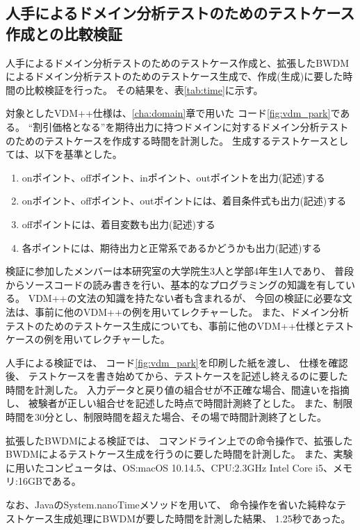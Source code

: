 \documentclass[uplatex, report, a4j, 10pt]{jsbook}
\begin{document}
\subsection{人手によるドメイン分析テストのためのテストケース作成との比較検証}\label{sec:domain_exam}

人手によるドメイン分析テストのためのテストケース作成と、拡張したBWDMによるドメイン分析テストのためのテストケース生成で、作成(生成)に要した時間の比較検証を行った。
その結果を、表\ref{tab:time}に示す。

対象としたVDM++仕様は、\ref{cha:domain}章で用いた コード\ref{fig:vdm_park}である。
“割引価格となる”を期待出力に持つドメインに対するドメイン分析テストのためのテストケースを作成する時間を計測した。
生成するテストケースとしては、以下を基準とした。
\begin{enumerate}
  \item onポイント、offポイント、inポイント、outポイントを出力(記述)する
  \item onポイント、offポイント、outポイントには、着目条件式も出力(記述)する
  \item offポイントには、着目変数も出力(記述)する
  \item 各ポイントには、期待出力と正常系であるかどうかも出力(記述)する
\end{enumerate}

検証に参加したメンバーは本研究室の大学院生3人と学部4年生1人であり、
普段からソースコードの読み書きを行い、基本的なプログラミングの知識を有している。
VDM++の文法の知識を持たない者も含まれるが、
今回の検証に必要な文法は、事前に他のVDM++の例を用いてレクチャーした。
また、ドメイン分析テストのためのテストケース生成についても、事前に他のVDM++仕様とテストケースの例を用いてレクチャーした。

人手による検証では、
コード\ref{fig:vdm_park}を印刷した紙を渡し、
仕様を確認後、
テストケースを書き始めてから、テストケースを記述し終えるのに要した時間を計測した。
入力データと戻り値の組合せが不正確な場合、間違いを指摘し、
被験者が正しい組合せを記述した時点で時間計測終了とした。
また、制限時間を30分とし、制限時間を超えた場合、その場で時間計測終了とした。

拡張したBWDMによる検証では、
コマンドライン上での命令操作で、拡張したBWDMによるテストケース生成を行うのに要した時間を計測した。
また、実験に用いたコンピュータは、OS:macOS 10.14.5、CPU:2.3GHz Intel Core i5、メモリ:16GBである。

なお、JavaのSystem.nanoTime\cite{nanotime}メソッドを用いて、
命令操作を省いた純粋なテストケース生成処理にBWDMが要した時間を計測した結果、
1.25秒であった。
\end{document}
